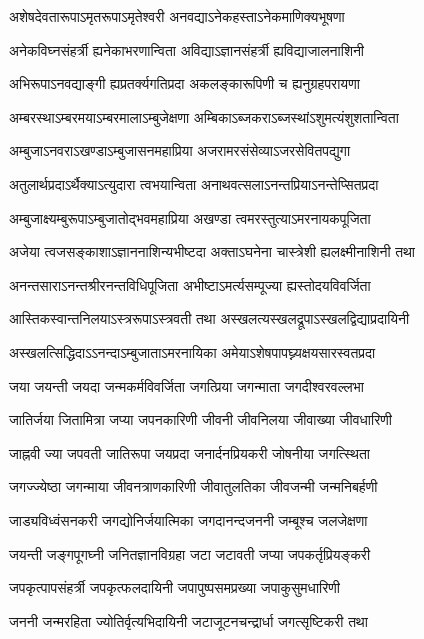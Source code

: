 \twolineshloka
{अशेषदेवतारूपाऽमृतरूपाऽमृतेश्वरी}
{अनवद्याऽनेकहस्ताऽनेकमाणिक्यभूषणा}%

\twolineshloka
{अनेकविघ्नसंहर्त्री ह्यनेकाभरणान्विता}
{अविद्याऽज्ञानसंहर्त्री ह्यविद्याजालनाशिनी}%

\twolineshloka
{अभिरूपाऽनवद्याङ्गी ह्यप्रतर्क्यगतिप्रदा}
{अकलङ्कारूपिणी च ह्यनुग्रहपरायणा}%

\twolineshloka
{अम्बरस्थाऽम्बरमयाऽम्बरमालाऽम्बुजेक्षणा}
{अम्बिकाऽब्जकराऽब्जस्थांऽशुमत्यंशुशतान्विता}%

\twolineshloka
{अम्बुजाऽनवराऽखण्डाऽम्बुजासनमहाप्रिया}
{अजरामरसंसेव्याऽजरसेवितपद्युगा}%

\twolineshloka
{अतुलार्थप्रदाऽर्थैक्याऽत्युदारा त्वभयान्विता}
{अनाथवत्सलाऽनन्तप्रियाऽनन्तेप्सितप्रदा}%

\twolineshloka
{अम्बुजाक्ष्यम्बुरूपाऽम्बुजातोद्भवमहाप्रिया}
{अखण्डा त्वमरस्तुत्याऽमरनायकपूजिता}%

\twolineshloka
{अजेया त्वजसङ्काशाऽज्ञाननाशिन्यभीष्टदा}
{अक्ताऽघनेना चास्त्रेशी ह्यलक्ष्मीनाशिनी तथा}%

\twolineshloka
{अनन्तसाराऽनन्तश्रीरनन्तविधिपूजिता}
{अभीष्टाऽमर्त्यसम्पूज्या ह्यस्तोदयविवर्जिता}%

\twolineshloka
{आस्तिकस्वान्तनिलयाऽस्त्ररूपाऽस्त्रवती तथा}
{अस्खलत्यस्खलद्रूपाऽस्खलद्विद्याप्रदायिनी}%

\twolineshloka
{अस्खलत्सिद्धिदाऽऽनन्दाऽम्बुजाताऽमरनायिका}
{अमेयाऽशेषपापघ्न्यक्षयसारस्वतप्रदा}%

\twolineshloka
{जया जयन्ती जयदा जन्मकर्मविवर्जिता}
{जगत्प्रिया जगन्माता जगदीश्वरवल्लभा}%

\twolineshloka
{जातिर्जया जितामित्रा जप्या जपनकारिणी}
{जीवनी जीवनिलया जीवाख्या जीवधारिणी}%

\twolineshloka
{जाह्नवी ज्या जपवती जातिरूपा जयप्रदा}
{जनार्दनप्रियकरी जोषनीया जगत्स्थिता}%

\twolineshloka
{जगज्ज्येष्ठा जगन्माया जीवनत्राणकारिणी}
{जीवातुलतिका जीवजन्मी जन्मनिबर्हणी}%

\twolineshloka
{जाड्यविध्वंसनकरी जगद्योनिर्जयात्मिका}
{जगदानन्दजननी जम्बूश्च जलजेक्षणा}%

\twolineshloka
{जयन्ती जङ्गपूगघ्नी जनितज्ञानविग्रहा}
{जटा जटावती जप्या जपकर्तृप्रियङ्करी}%

\twolineshloka
{जपकृत्पापसंहर्त्री जपकृत्फलदायिनी}
{जपापुष्पसमप्रख्या जपाकुसुमधारिणी}%

\twolineshloka
{जननी जन्मरहिता ज्योतिर्वृत्यभिदायिनी}
{जटाजूटनचन्द्रार्धा जगत्सृष्टिकरी तथा}%

